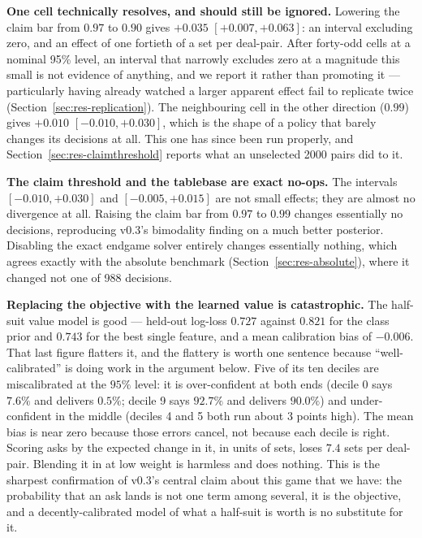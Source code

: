 \documentclass[11pt,a4paper]{article}
\begin{document}
\textbf{One cell technically resolves, and should still be ignored.} Lowering
the claim bar from $0.97$ to $0.90$ gives $+0.035$ $[+0.007, +0.063]$: an
interval excluding zero, and an effect of one fortieth of a set per deal-pair.
After forty-odd cells at a nominal 95\% level, an interval that narrowly
excludes zero at a magnitude this small is not evidence of anything, and we
report it rather than promoting it --- particularly having already watched a
larger apparent effect fail to replicate twice
(Section~\ref{sec:res-replication}). The neighbouring cell in the other
direction ($0.99$) gives $+0.010$ $[-0.010, +0.030]$, which is the shape of a
policy that barely changes its decisions at all. This one has since been run
properly, and Section~\ref{sec:res-claimthreshold} reports what an unselected
2000 pairs did to it.

\textbf{The claim threshold and the tablebase are exact no-ops.} The intervals
$[-0.010, +0.030]$ and $[-0.005, +0.015]$ are not small effects; they are almost
no divergence at all. Raising the claim bar from $0.97$ to $0.99$ changes
essentially no decisions, reproducing v0.3's bimodality finding on a much better
posterior. Disabling the exact endgame solver entirely changes essentially
nothing, which agrees exactly with the absolute benchmark
(Section~\ref{sec:res-absolute}), where it changed not one of 988 decisions.

\textbf{Replacing the objective with the learned value is catastrophic.} The
half-suit value model is good --- held-out log-loss $0.727$ against $0.821$ for
the class prior and $0.743$ for the best single feature, and a mean calibration
bias of $-0.006$. That last figure flatters it, and the flattery is worth one
sentence because ``well-calibrated'' is doing work in the argument below. Five
of its ten deciles are miscalibrated at the $95\%$ level: it is over-confident
at both ends (decile 0 says $7.6\%$ and delivers $0.5\%$; decile 9 says $92.7\%$
and delivers $90.0\%$) and under-confident in the middle (deciles 4 and 5 both
run about $3$ points high). The mean bias is near zero because those errors
cancel, not because each decile is right. Scoring asks by the expected change in
it, in units of sets, loses $7.4$ sets per deal-pair. Blending it in at low
weight is harmless and does nothing. This is the sharpest confirmation of v0.3's
central claim about this game that we have: the probability that an ask lands is
not one term among several, it is the objective, and a decently-calibrated model of
what a half-suit is worth is no substitute for it.
\end{document}
